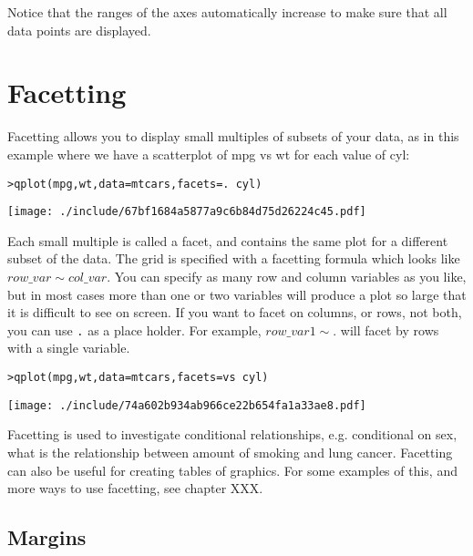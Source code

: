 Notice that the ranges of the axes automatically increase to make sure that all data points are displayed.

\section{Facetting}\label{sec:facetting}

Facetting allows you to display small multiples of subsets of your data, as in this example where we have a scatterplot of mpg vs wt for each value of cyl:

\begin{alltt}
> qplot(mpg, wt, data = mtcars, facets = . ~ cyl)
\end{alltt}
\texttt{[image: ./include/67bf1684a5877a9c6b84d75d26224c45.pdf]}
\begin{alltt}

\end{alltt}

Each small multiple is called a facet, and contains the same plot for a different subset of the data.  The grid is specified with a facetting formula which looks like $row\_var \sim col\_var $.  You can specify as many row and column variables as you like, but in most cases more than one or two variables will produce a plot so large that it is difficult to see on screen.  If you want to facet on columns, or rows, not both, you can use {\tt .} as a place holder.  For example, $row\_var1 \sim .$ will facet by rows with a single variable.  

\begin{alltt}
> qplot(mpg, wt, data = mtcars, facets = vs ~ cyl)
\end{alltt}
\texttt{[image: ./include/74a602b934ab966ce22b654fa1a33ae8.pdf]}
\begin{alltt}

\end{alltt}

Facetting is used to investigate conditional relationships, e.g. conditional on sex, what is the relationship between amount of smoking and lung cancer.  Facetting can also be useful for creating tables of graphics.  For some examples of this, and more ways to use facetting, see chapter XXX.

\subsection{Margins}\label{sub:margins}

